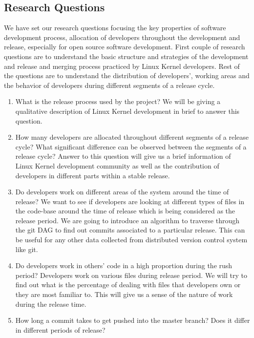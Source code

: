 \documentclass{acm_proc_article-sp}
\begin{document}
\subsection{Research Questions}
We have set our research questions focusing the key properties of software development process, allocation of developers throughout the development and release, especially for open source software development. First couple of research questions are to understand the basic structure and strategies of the development and release and merging process practiced by Linux Kernel developers. Rest of the questions are to understand the distribution of developers', working areas and the behavior of developers during different segments of a release cycle.

\renewcommand{\labelenumi}{RQ\theenumi:}
\begin{enumerate}
\item What is the release process used by the project? \newline
We will be giving a qualitative description of Linux Kernel development in brief to answer this question.
\item How many developers are allocated throughout different segments of a release cycle? What significant difference can be observed between the segments of a release cycle? \newline
Answer to this question will give us a brief information of Linux Kernel development community as well as the contribution of developers in different parts within a stable release.
\item Do developers work on different areas of the system around the time of release? \newline
We want to see if developers are looking at different types of files in the code-base around the time of release which is being considered as the release period. We are going to introduce an algorithm to traverse through the git DAG to find out commits associated to a particular release. This can be useful for any other data collected from distributed version control system like git.
\item Do developers work in others' code in a high proportion during the rush period?\newline
Developers work on various files during release period. We will try to find out what is the percentage of dealing with files that developers own or they are most familiar to. This will give us a sense of the nature of work during the release time.
\item How long a commit takes to get pushed into the master branch? Does it differ in different periods of release?\newline

\end{enumerate}
\end{document}
